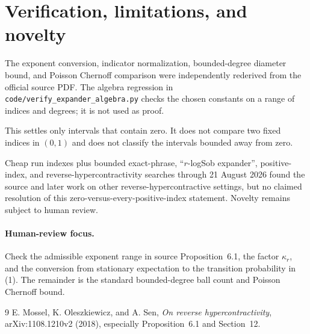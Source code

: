 \documentclass[11pt]{article}
\begin{document}
\section*{Verification, limitations, and novelty}
The exponent conversion, indicator normalization, bounded-degree diameter
bound, and Poisson Chernoff comparison were independently rederived from the
official source PDF.  The algebra regression in
\texttt{code/verify\_expander\_algebra.py} checks the chosen constants on a
range of indices and degrees; it is not used as proof.

This settles only intervals that contain zero.  It does not compare two fixed
indices in $(0,1)$ and does not classify the intervals bounded away from zero.

Cheap run indexes plus bounded exact-phrase, ``$r$-logSob expander'',
positive-index, and reverse-hypercontractivity searches through 21 August
2026 found the source and later work on other reverse-hypercontractive
settings, but no claimed resolution of this zero-versus-every-positive-index
statement.  Novelty remains subject to human review.

\paragraph{Human-review focus.}
Check the admissible exponent range in source Proposition~6.1, the factor
$\kappa_r$, and the conversion from stationary expectation to the transition
probability in (1).  The remainder is the standard bounded-degree ball count
and Poisson Chernoff bound.

\begin{thebibliography}{9}
E. Mossel, K. Oleszkiewicz, and A. Sen,
\emph{On reverse hypercontractivity}, arXiv:1108.1210v2 (2018),
especially Proposition~6.1 and Section~12.
\end{thebibliography}
\end{document}
